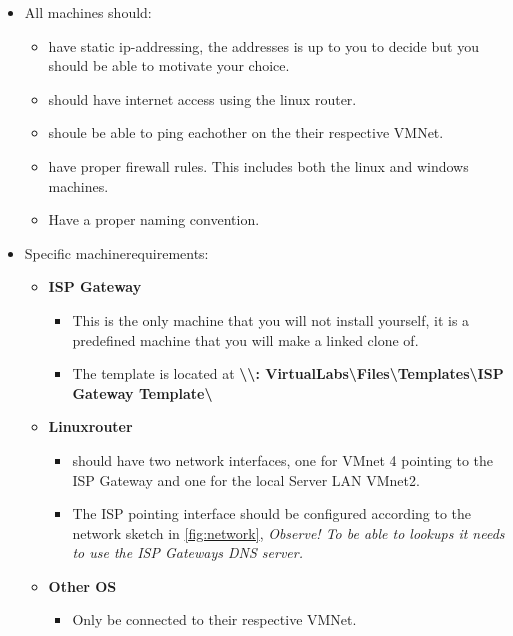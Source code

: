 \documentclass[paper=a4, fontsize=11pt]{report} %
\begin{document}
\begin{itemize}
    \item All machines should:
    \begin{itemize}
        \item have static ip-addressing, the addresses is up to you to decide but you should be able to motivate your choice. 
	\item should have internet access using the linux router.
	\item shoule be able to ping eachother on the their respective VMNet.
        \item have proper firewall rules. This includes both the linux and windows machines.
    	\item Have a proper naming convention.
    \end{itemize}
	\item Specific machinerequirements:
    \begin{itemize}
        \item \textbf{ISP Gateway}
        \begin{itemize}
		\item This is the only machine that you will not install yourself, it is a predefined machine that you will make a linked clone of.
        	\item The template is located at \textbf{\textbackslash\textbackslash: VirtualLabs\textbackslash Files\textbackslash Templates\textbackslash ISP Gateway Template\textbackslash }
        \end{itemize}

        \item \textbf{Linuxrouter}
        \begin{itemize}
		\item should have two network interfaces, one for VMnet 4 pointing to the ISP Gateway and one for the local Server LAN VMnet2.
            	\item The ISP pointing interface should be configured according to the network sketch in \figurename \ref{fig:network}, \textit{Observe! To be able to lookups it needs to use the ISP Gateways DNS server.}
        \end{itemize}
        
        \item \textbf{Other OS}
        \begin{itemize}
		\item Only be connected to their respective VMNet.
        \end{itemize}
        
    \end{itemize}
\end{itemize}
\end{document}
